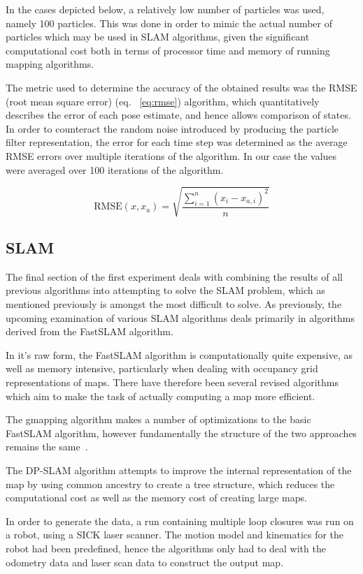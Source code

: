 \documentclass[english]{article}
\begin{document}
In the cases depicted below, a relatively low number of particles was used, namely 100 particles. This was done in order to mimic the actual number of particles which may be used in SLAM algorithms, given the significant computational cost both in terms of processor time and memory of running mapping algorithms.

The metric used to determine the accuracy of the obtained results was the RMSE (root mean square error) (eq. ~\ref{eq:rmse}) algorithm, which quantitatively describes the error of each pose estimate, and hence allows comparison of states. In order to counteract the random noise introduced by producing the particle filter representation, the error for each time step was determined as the average RMSE errors over multiple iterations of the algorithm. In our case the values were averaged over 100 iterations of the algorithm.

\begin{equation}
\label{eq:rmse}
\mathrm{RMSE}(x, x_a) = \sqrt{\frac{\sum^n_{i=1} \left(x_i - x_{a,i}\right)^2}{n}}
\end{equation}

\subsection{SLAM}
The final section of the first experiment deals with combining the results of all previous algorithms into attempting to solve the SLAM problem, which as mentioned previously is amongst the most difficult to solve. As previously, the upcoming examination of various SLAM algorithms deals primarily in algorithms derived from the FastSLAM algorithm.

In it's raw form, the FastSLAM algorithm is computationally quite expensive, as well as memory intensive, particularly when dealing with occupancy grid representations of maps. There have therefore been several revised algorithms which aim to make the task of actually computing a map more efficient.

The gmapping algorithm makes a number of optimizations to the basic FastSLAM algorithm, however fundamentally the structure of the two approaches remains the same~\cite{gmapping}.

The DP-SLAM algorithm attempts to improve the internal representation of the map by using common ancestry to create a tree structure, which reduces the computational cost as well as the memory cost of creating large maps.

In order to generate the data, a run containing multiple loop closures was run on a robot, using a SICK laser scanner. The motion model and kinematics for the robot had been predefined, hence the algorithms only had to deal with the odometry data and laser scan data to construct the output map.
\end{document}
